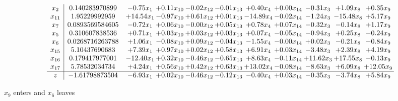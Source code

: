 \documentclass[9pt]{article}
\begin{document}
 \[\begin{array}{c| c c@{\hskip 2pt} c@{\hskip 2pt} c@{\hskip 2pt} c@{\hskip 2pt} c@{\hskip 2pt} c@{\hskip 2pt} c@{\hskip 2pt} c@{\hskip 2pt} c@{\hskip 2pt} }
 x_{2}   &  0.140283970899 & -0.75 x_{1} & +  0.11 x_{10} & -0.02 x_{12} & -0.01 x_{13} & +  0.40 x_{4} & +  0.00 x_{14} & -0.31 x_{3} & +  1.09 x_{8} & +  0.35 x_{9}\\
 x_{11}   &  1.95229992959 & + 14.54 x_{1} & -0.97 x_{10} & +  0.61 x_{12} & +  0.01 x_{13} & -14.89 x_{4} & -0.02 x_{14} & -1.24 x_{3} & -15.48 x_{8} & +  5.17 x_{9}\\
 x_{7}   &  0.0893569584605 & -0.72 x_{1} & +  0.06 x_{10} & -0.00 x_{12} & +  0.05 x_{13} & +  0.78 x_{4} & +  0.07 x_{14} & -0.32 x_{3} & -0.14 x_{8} & +  1.17 x_{9}\\
 x_{5}   &  0.310607838536 & +  0.71 x_{1} & +  0.03 x_{10} & +  0.03 x_{12} & +  0.03 x_{13} & +  0.07 x_{4} & -0.05 x_{14} & -0.94 x_{3} & +  0.25 x_{8} & -0.24 x_{9}\\
 x_{6}   &  0.0268716263788 & +  1.06 x_{1} & -0.08 x_{10} & +  0.09 x_{12} & -0.04 x_{13} & -1.55 x_{4} & -0.00 x_{14} & +  0.02 x_{3} & -0.21 x_{8} & -0.84 x_{9}\\
 x_{15}   &  5.10437690683 & +  7.39 x_{1} & +  0.97 x_{10} & +  0.02 x_{12} & +  0.58 x_{13} & +  6.91 x_{4} & +  0.03 x_{14} & -3.48 x_{3} & +  2.39 x_{8} & +  4.19 x_{9}\\
 x_{16}   &  0.179417977001 & -12.40 x_{1} & +  0.32 x_{10} & -0.46 x_{12} & -0.65 x_{13} & +  8.63 x_{4} & -0.11 x_{14} & + 11.62 x_{3} & + 17.55 x_{8} & -0.13 x_{9}\\
 x_{17}   &  5.78532034734 & +  4.24 x_{1} & +  0.56 x_{10} & +  0.42 x_{12} & +  0.63 x_{13} & + 13.02 x_{4} & -0.08 x_{14} & -8.63 x_{3} & +  6.09 x_{8} & + 12.05 x_{9}\\
\hline
z    &  -1.61798873504 & -6.93 x_{1} & +  0.02 x_{10} & -0.46 x_{12} & -0.12 x_{13} & -0.40 x_{4} & +  0.03 x_{14} & -0.35 x_{3} & -3.74 x_{8} & +  5.84 x_{9}\\
\end{array}\]


 $ x_{9} $ enters and $ x_{6} $ leaves 
\end{document}
